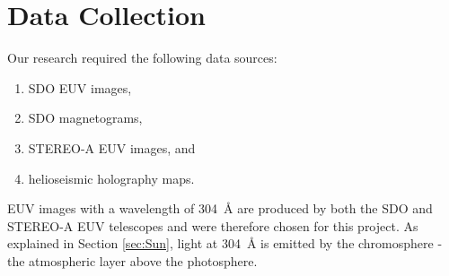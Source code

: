 \documentclass[11pt,a4paper,onecolumn]{report}
\begin{document}
  



\section{Data Collection}
\label{sec:data_collection}
Our research required the following data sources:
\begin{enumerate}
  \item SDO EUV images,
  \item SDO magnetograms,
  \item STEREO-A EUV images, and
  \item helioseismic holography maps.
\end{enumerate}
EUV images with a wavelength of \SI{304}{\angstrom} are produced by both the SDO
and STEREO-A EUV telescopes and were therefore chosen for this project. As explained in
Section \ref{sec:Sun}, light at \SI{304}{\angstrom} is emitted by the
chromosphere - the atmospheric layer above the photosphere. \\
\end{document}
